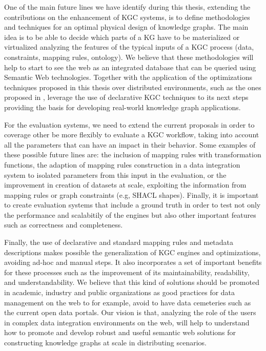 One of the main future lines we have identify during this thesis, extending the contributions on the enhancement of KGC systems, is to define methodologies and techniques for an optimal physical design of knowledge graphs. The main idea is to be able to decide which parts of a KG have to be materialized or virtualized analyzing the features of the typical inputs of a KGC process (data, constraints, mapping rules, ontology). We believe that these methodologies will help to start to see the web as an integrated database that can be queried using Semantic Web technologies. Together with the application of the optimizations techniques proposed in this thesis over distributed environments, such as the ones proposed in \citep{endris2019ontario,mami2019squerall}, leverage the use of declarative KGC techniques to its next steps providing the basis for developing real-world knowledge graph applications.

For the evaluation systems, we need to extend the current proposals in order to coverage other be more flexibly to evaluate a KGC workflow, taking into account all the parameters that can have an impact in their behavior. Some examples of these possible future lines are: the inclusion of mapping rules with transformation functions, the adaption of mapping rules construction in a data integration system to isolated parameters from this input in the evaluation, or the improvement in creation of datasets at scale, exploiting the information from mapping rules or graph constraints (e.g, SHACL shapes). Finally, it is important to create evaluation systems that include a ground truth in order to test not only the performance and scalabitily of the engines but also other important features such as correctness and completeness.

Finally, the use of declarative and standard mapping rules and metadata descriptions makes possible the generalization of KGC engines and optimizations, avoiding ad-hoc and manual steps. It also incorporates a set of important benefits for these processes such as the improvement of its maintainability, readability, and understandability. We believe that this kind of solutions should be promoted in academic, industry and public organizations as good practices for data management on the web to for example, avoid to have data cemeteries such as the current open data portals. Our vision is that, analyzing the role of the users in complex data integration environments on the web, will help to understand how to promote and develop robust and useful semantic web solutions for constructing knowledge graphs at scale in distributing scenarios.

